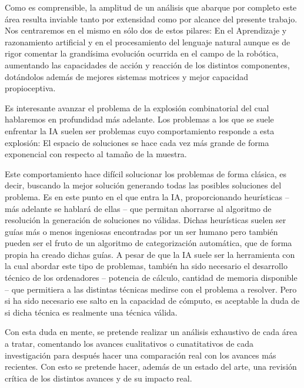 Como es comprensible, la amplitud de un análisis que abarque por completo este
área resulta inviable tanto por extensidad como por alcance del presente
trabajo. Nos centraremos en el mismo en sólo dos de estos pilares: En el
Aprendizaje y razonamiento artificial y en el procesamiento del lenguaje natural
aunque es de rigor comentar la grandísima evolución ocurrida en el campo de la
robótica, aumentando las capacidades de acción y reacción de los distintos
componentes, dotándolos además de mejores sistemas motrices y mejor capacidad
propioceptiva.

Es interesante avanzar el problema de la explosión combinatorial del cual
hablaremos en profundidad más adelante. Los problemas a los que se suele
enfrentar la IA suelen ser problemas cuyo comportamiento responde a esta
explosión: El espacio de soluciones se hace cada vez más grande de forma
exponencial con respecto al tamaño de la muestra.

Este comportamiento hace difícil solucionar los problemas de forma clásica, es
decir, buscando la mejor solución generando todas las posibles soluciones del
problema. Es en este punto en el que entra la IA, proporcionando heurísticas –
más adelante se hablará de ellas – que permitan ahorrarse al algoritmo de
resolución la generación de soluciones no válidas. Dichas heurísticas suelen ser
guías más o menos ingeniosas encontradas por un ser humano pero también pueden
ser el fruto de un algoritmo de categorización automática, que de forma propia
ha creado dichas guías. A pesar de que la IA suele ser la herramienta con la
cual abordar este tipo de problemas, también ha sido necesario el desarrollo
técnico de los ordenadores – potencia de cálculo, cantidad de memoria disponible
– que permitiera a las distintas técnicas medirse con el problema a
resolver. Pero si ha sido necesario ese salto en la capacidad de cómputo, es
aceptable la duda de si dicha técnica es realmente una técnica válida.

Con esta duda en mente, se pretende realizar un análisis exhaustivo de cada área
a tratar, comentando los avances cualitativos o cunatitativos de cada
investigación para después hacer una comparación real con los avances más
recientes. Con esto se pretende hacer, además de un estado del arte, una
revisión crítica de los distintos avances y de su impacto real.



